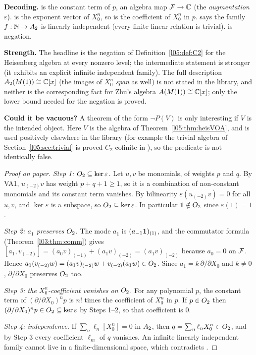 \begin{dictionary}
\textbf{Decoding.}  is the constant term of $p$, an algebra map
$\mathcal{F}\to{\mathbb{C}}$ (the \emph{augmentation} $\varepsilon$).  is the exponent vector of
$X_0^n$, so  is the coefficient of $X_0^n$ in $p$.
 says the family $f:{\mathbb{N}}\to A_2$ is linearly independent (every finite linear
relation is trivial).  is negation.

\textbf{Strength.} The headline is the negation of Definition~\ref{l05:def:C2} for the Heisenberg algebra at
every nonzero level; the intermediate statement  is stronger
(it exhibits an explicit infinite independent family). The full description $A_2(M(1))\cong{\mathbb{C}}[x]$ (the
images of $X_0^n$ \emph{span} as well) is not stated in the library, and neither is the corresponding fact for
Zhu's algebra $A(M(1))\cong{\mathbb{C}}[x]$; only the lower bound needed for the negation is proved.

\textbf{Could it be vacuous?} A theorem of the form $\neg P(V)$ is only interesting if $V$ is the intended
object. Here $V$ is the algebra of Theorem~\ref{l05:thm:heisVOA}, and  is used positively
elsewhere in the library (for example the trivial algebra of Section~\ref{l05:sec:trivial} is proved
$C_2$-cofinite in ), so the predicate is not identically false.
\end{dictionary}

\begin{proof}[Proof on paper]
\emph{Step 1: $O_2\subseteq\ker\varepsilon$.} Let $u,v$ be monomials, of weights $p$ and $q$. By VA1,
$u_{(-2)}v$ has weight $p+q+1\ge1$, so it is a combination of non-constant monomials and its constant term
vanishes. By bilinearity $\varepsilon(u_{(-2)}v)=0$ for all $u,v$, and $\ker\varepsilon$ is a subspace, so
$O_2\subseteq\ker\varepsilon$. In particular $\mathbf{1}\notin O_2$ since $\varepsilon(1)=1$.

\emph{Step 2: $a_1$ preserves $O_2$.} The mode $a_1$ is $(a_{-1}\mathbf{1})_{(1)}$, and the commutator
formula (Theorem~\ref{l03:thm:comm}) gives
$[a_1,v_{(-2)}]=(a_0v)_{(-1)}+(a_1v)_{(-2)}=(a_1v)_{(-2)}$ because $a_0=0$ on $\mathcal{F}$. Hence
$a_1(v_{(-2)}w)=(a_1v)_{(-2)}w+v_{(-2)}(a_1w)\in O_2$. Since $a_1=k\,\partial/\partial X_0$ and $k\ne0$,
$\partial/\partial X_0$ preserves $O_2$ too.

\emph{Step 3: the $X_0^n$-coefficient vanishes on $O_2$.} For any polynomial $p$, the constant term of
$(\partial/\partial X_0)^np$ is $n!$ times the coefficient of $X_0^n$ in $p$. If $p\in O_2$ then
$(\partial/\partial X_0)^np\in O_2\subseteq\ker\varepsilon$ by Steps 1--2, so that coefficient is $0$.

\emph{Step 4: independence.} If $\sum_n\ell_n[X_0^n]=0$ in $A_2$, then $q=\sum_n\ell_nX_0^n\in O_2$, and
by Step 3 every coefficient $\ell_m$ of $q$ vanishes. An infinite linearly independent family cannot live in a
finite-dimensional space, which contradicts .
\end{proof}


